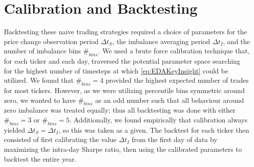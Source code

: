 \section{Calibration and Backtesting}
Backtesting these naive trading strategies required a choice of parameters for the price change observation period $\Delta t_S$, the imbalance averaging period $\Delta t_I$, and the number of imbalance bins $\#_{bins}$. We used a brute force calibration technique that, for each ticker and each day, traversed the potential parameter space searching for the highest number of timesteps at which \eqref{eq:EDAKeyInsight} could be utilized. We found that $\#_{bins} = 4$ provided the highest expected number of trades for most tickers. However, as we were utilizing percentile bins symmetric around zero, we wanted to have $\#_{bins}$ as an odd number such that all behaviour around zero imbalance was treated equally; thus all backtesting was done with either $\#_{bins} = 3$ or $\#_{bins} = 5$. Additionally, we found empirically that calibration always yielded $\Delta t_S = \Delta t_I$, so this was taken as a given. The backtest for each ticker then consisted of first calibrating the value $\Delta t_I$ from the first day of data by maximizing the intra-day Sharpe ratio, then using the calibrated parameters to backtest the entire year.

